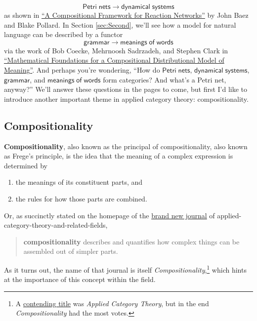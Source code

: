 \documentclass{tufte-handout-tai}
\theoremstyle{plain}
\theoremstyle{definition}
\theoremstyle{remark}
\begin{document}
\[\mathsf{Petri\;nets}  \to  \mathsf{dynamical\;systems}\]
as shown in \href{https://arxiv.org/abs/1704.02051}{``A Compositional Framework for Reaction Networks''} by John Baez and Blake Pollard. In Section \ref{sec:Second}, we'll see how a model for natural language can be described by a functor
\[\mathsf{grammar}  \to \mathsf{meanings\;of\;words}\]
via the work of Bob Coecke, Mehrnoosh Sadrzadeh, and Stephen Clark in \href{https://arxiv.org/abs/1003.4394}{``Mathematical Foundations for a Compositional Distributional Model of Meaning''}. And perhaps you're wondering, ``How do $\mathsf{Petri\;nets}$, $\mathsf{dynamical\;systems}$, $\mathsf{grammar}$, and $\mathsf{meanings\;of\;words}$ form categories? And what's a Petri net, anyway?'' We'll answer these questions in the pages to come, but first I'd like to introduce another important theme in applied category theory: compositionality. 







\newpage
\subsection{Compositionality}\label{sec:Comp}
\textbf{Compositionality}, also known as the principal of compositionality, also known as Frege's principle, is the idea that the meaning of a complex \textcolor{RubineRed}{expression} is determined by
	\begin{enumerate}
		\item the meanings of its constituent \textcolor{BurntOrange}{parts}, and 
		\item the rules for how those parts are combined.
	\end{enumerate}
Or, as succinctly stated on the homepage of the \href{http://www.compositionality-journal.org/}{brand new journal}
of applied-category-theory-and-related-fields, 
	\begin{quote}
	\textbf{compositionality} describes and quantifies how complex things can be assembled out of simpler parts.
	\end{quote}
As it turns out, the name of that journal is itself \textit{Compositionality},\footnote{A \href{https://golem.ph.utexas.edu/category/2018/05/compositionality.html\#c053932}{contending title} was \textit{Applied Category Theory}, but in the end \textit{Compositionality} had the most votes.} which hints at the importance of this concept within the field.
\end{document}
